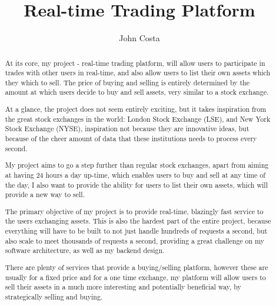 \documentclass[]{report}
\title{Real-time Trading Platform}
\author{John Costa}
\begin{document}
\maketitle

\begin{abstract}
	At its core, my project - real-time trading platform, will allow users to participate in trades with other users in real-time, and also allow users to list their own assets which they which to sell. The price of buying and selling is entirely determined by the amount at which users decide to buy and sell assets, very similar to a stock exchange.
	
	At a glance, the project does not seem entirely exciting, but it takes inspiration from the great stock exchanges in the world: London Stock Exchange (LSE), and New York Stock Exchange (NYSE), inspiration not because they are innovative ideas, but because of the cheer amount of data that these institutions needs to process every second.
	
	My project aims to go a step further than regular stock exchanges, apart from aiming at having 24 hours a day up-time, which enables users to buy and sell at any time of the day, I also want to provide the ability for users to list their own assets, which will provide a new way to sell.
	
	The primary objective of my project is to provide real-time, blazingly fast service to the users exchanging assets. This is also the hardest part of the entire project, because everything will have to be built to not just handle hundreds of requests a second, but also scale to meet thousands of requests a second, providing a great challenge on my software architecture, as well as my backend design.
	
	There are plenty of services that provide a buying/selling platform, however these are usually for a fixed price and for a one time exchange, my platform will allow users to sell their assets in a much more interesting and potentially beneficial way, by strategically selling and buying.
\end{abstract}
\end{document}
